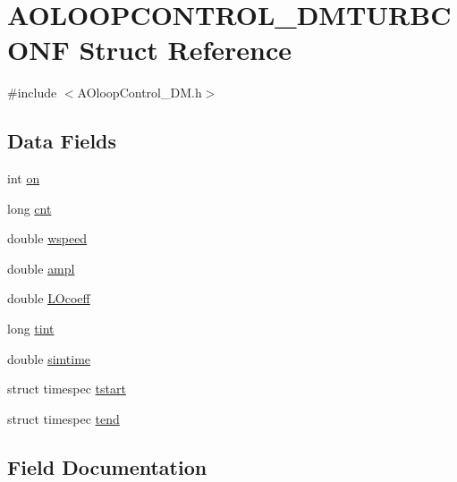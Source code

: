\hypertarget{structAOLOOPCONTROL__DMTURBCONF}{}\section{A\+O\+L\+O\+O\+P\+C\+O\+N\+T\+R\+O\+L\+\_\+\+D\+M\+T\+U\+R\+B\+C\+O\+N\+F Struct Reference}
\label{structAOLOOPCONTROL__DMTURBCONF}


{\ttfamily \#include $<$A\+Oloop\+Control\+\_\+\+D\+M.\+h$>$}

\subsection*{Data Fields}
\begin{DoxyCompactItemize}
\item 
int \hyperlink{structAOLOOPCONTROL__DMTURBCONF_afbceca5bf5d55347cabaf44b9e3fc834}{on}
\item 
long \hyperlink{structAOLOOPCONTROL__DMTURBCONF_afe27d92afe5a4006a00d45100a43cb14}{cnt}
\item 
double \hyperlink{structAOLOOPCONTROL__DMTURBCONF_aaac3d0a47b600f128ab17e8d066aa3a2}{wspeed}
\item 
double \hyperlink{structAOLOOPCONTROL__DMTURBCONF_a31e5bd8ebab2b23b811fd4a0b417161b}{ampl}
\item 
double \hyperlink{structAOLOOPCONTROL__DMTURBCONF_add3ae0ba50727441f0a838d998297d5e}{L\+Ocoeff}
\item 
long \hyperlink{structAOLOOPCONTROL__DMTURBCONF_a1d7cbe276afaf5c4de799e619abc3432}{tint}
\item 
double \hyperlink{structAOLOOPCONTROL__DMTURBCONF_aebfcb8b30daf186c5232f1559b3f704c}{simtime}
\item 
struct timespec \hyperlink{structAOLOOPCONTROL__DMTURBCONF_aab4485b269aa4f1908abc5f563585eef}{tstart}
\item 
struct timespec \hyperlink{structAOLOOPCONTROL__DMTURBCONF_a0fef3776d6168218244bb0ed1de2b4c9}{tend}
\end{DoxyCompactItemize}


\subsection{Field Documentation}
\hypertarget{structAOLOOPCONTROL__DMTURBCONF_a31e5bd8ebab2b23b811fd4a0b417161b}{}
